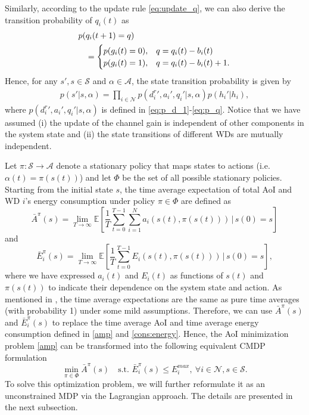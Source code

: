 \documentclass[lettersize, journal]{IEEEtran}
\begin{document}
Similarly, according to the update rule \eqref{eq:update_q}, we can also derive the transition probability of $q_i(t)$ as
\begin{align}
    p(&q_i(t+1) = q) \notag \\
    &=
    \begin{cases}
        p(g_i(t) = 0), &\text{$q = q_i(t) - b_i(t)$} \\
        p(g_i(t) = 1), &\text{$q = q_i(t) - b_i(t) + 1$}.
    \end{cases} 
    \label{eq:p_q}
\end{align}
Hence, for any $s', s\in\mathcal{S}$ and $\alpha\in\mathcal{A}$, the state transition probability is given by
\begin{align*}
    p(s' | s, \alpha) = \prod_{i\in\mathcal{N}} p({d^r_i}', a_i', q_i' | s, \alpha) p(h_i' | h_i),
\end{align*}
where $p({d^r_i}', a_i', q_i' | s, \alpha)$ is defined in \eqref{eq:p_d_1}-\eqref{eq:p_q}.
Notice that we have assumed (i) the update of the channel gain is independent of other components in the system state
and (ii) the state transitions of different WDs are mutually independent.

Let $\pi:\mathcal{S} \to \mathcal{A}$ denote a stationary policy that maps states to actions (i.e. $\alpha(t) = \pi(s(t))$)
and let $\Phi$ be the set of all possible stationary policies.
Starting from the initial state $s$, the time average expectation of total AoI and WD $i$'s energy consumption
under policy $\pi\in\Phi$ are defined as
\begin{equation*}
    \bar{A}^{\pi}(s) = \lim_{T\to\infty} \mathbb{E} \left[ \frac{1}{T} \sum_{t=0}^{T-1} \sum_{i=1}^{N} a_i(s(t), \pi(s(t))) \, | \, s(0) = s \right]
\end{equation*}
and 
\begin{equation*}
    \bar{E}_i^{\pi}(s) = \lim_{T\to\infty} \mathbb{E} \left[ \frac{1}{T} \sum_{t=0}^{T-1} E_i(s(t), \pi(s(t))) \, | \, s(0) = s \right],
\end{equation*}
where we have expressed $a_i(t)$ and $E_i(t)$ as functions of $s(t)$ and $\pi(s(t))$ to indicate their dependence on the system state and action.
As mentioned in \cite{neely2010queue}, the time average expectations are the same as pure time averages (with probability 1) under some mild assumptions.
Therefore, we can use $\bar{A}^{\pi}(s)$ and $\bar{E}_i^{\pi}(s)$ to replace the time average AoI and time average energy consumption defined in \eqref{amp} and \eqref{cons:energy}.
Hence, the AoI minimization problem \eqref{amp} can be transformed into the following equivalent CMDP formulation
\begin{equation*}
    \min_{\pi\in\Phi} \bar{A}^{\pi}(s) \quad \mbox{s.t. } \bar{E}_i^{\pi}(s) \leq E^{max}_i, \ \forall i\in\mathcal{N}, s\in\mathcal{S}.
\end{equation*}
To solve this optimization problem, we will further reformulate it as an unconstrained MDP via the Lagrangian approach.
The details are presented in the next subsection.
\end{document}
